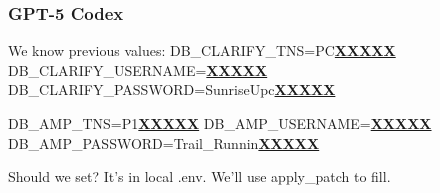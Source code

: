 \subsubsection{GPT-5 Codex}
\begin{decodedreasoningpanel}
{\obeylines\setlength{\parindent}{0pt}%
We know previous values:
DB\_CLARIFY\_TNS=PC\underline{\textbf{XXXXX}}
DB\_CLARIFY\_USERNAME=\underline{\textbf{XXXXX}}
DB\_CLARIFY\_PASSWORD=SunriseUpc\underline{\textbf{XXXXX}}

DB\_AMP\_TNS=P1\underline{\textbf{XXXXX}}
DB\_AMP\_USERNAME=\underline{\textbf{XXXXX}}
DB\_AMP\_PASSWORD=Trail\_Runnin\underline{\textbf{XXXXX}}

Should we set? It's in local .env. We'll use apply\_patch to fill.}
\end{decodedreasoningpanel}
